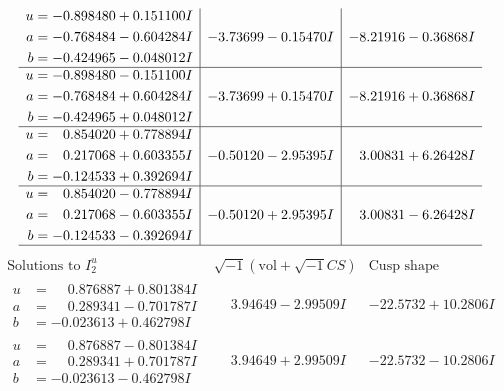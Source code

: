 \documentclass[1p]{elsarticle_modified}
\theoremstyle{definition}
\newcommand{\I}{\sqrt{-1}}
\begin{document}
$$\begin{array}{c|c|c}
\begin{aligned}
u &= -0.898480 + 0.151100 I \\
a &= -0.768484 - 0.604284 I \\
b &= -0.424965 - 0.048012 I\end{aligned}
 & -3.73699 - 0.15470 I & -8.21916 - 0.36868 I \\ \hline\begin{aligned}
u &= -0.898480 - 0.151100 I \\
a &= -0.768484 + 0.604284 I \\
b &= -0.424965 + 0.048012 I\end{aligned}
 & -3.73699 + 0.15470 I & -8.21916 + 0.36868 I \\ \hline\begin{aligned}
u &= \phantom{-}0.854020 + 0.778894 I \\
a &= \phantom{-}0.217068 + 0.603355 I \\
b &= -0.124533 + 0.392694 I\end{aligned}
 & -0.50120 - 2.95395 I & \phantom{-}3.00831 + 6.26428 I \\ \hline\begin{aligned}
u &= \phantom{-}0.854020 - 0.778894 I \\
a &= \phantom{-}0.217068 - 0.603355 I \\
b &= -0.124533 - 0.392694 I\end{aligned}
 & -0.50120 + 2.95395 I & \phantom{-}3.00831 - 6.26428 I\\
 \hline 
 \end{array}$$\newpage$$\begin{array}{c|c|c}  
\text{Solutions to }I^u_{2}& \I (\text{vol} + \sqrt{-1}CS) & \text{Cusp shape}\\
 \hline 
\begin{aligned}
u &= \phantom{-}0.876887 + 0.801384 I \\
a &= \phantom{-}0.289341 - 0.701787 I \\
b &= -0.023613 + 0.462798 I\end{aligned}
 & \phantom{-}3.94649 - 2.99509 I & -22.5732 + 10.2806 I \\ \hline\begin{aligned}
u &= \phantom{-}0.876887 - 0.801384 I \\
a &= \phantom{-}0.289341 + 0.701787 I \\
b &= -0.023613 - 0.462798 I\end{aligned}
 & \phantom{-}3.94649 + 2.99509 I & -22.5732 - 10.2806 I \\ \hline\begin{aligned}

\end{aligned}
\end{array}$$
\end{document}
